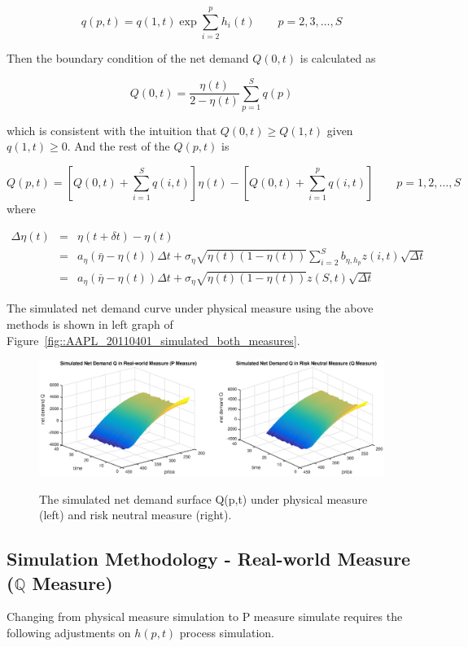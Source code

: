 \documentclass{article}
\begin{document}
$$
q(p,t) = q(1,t) \exp{\sum_{i=2}^{p}h_i(t)} \qquad p = 2, 3, \ldots, S
$$

Then the boundary condition of the net demand $Q(0,t)$ is calculated as

$$
Q(0,t) = \frac{\eta(t)}{2-\eta(t)} \sum_{p=1}^{S} q(p)
$$

which is consistent with the intuition that $Q(0,t) \geq Q(1,t)$ given $q(1,t)\geq 0$. And the rest of the $Q(p,t)$ is

$$
Q(p,t) = [Q(0,t) + \sum_{i=1}^{S}q(i,t)]\eta(t) - [Q(0,t) + \sum_{i=1}^{p}q(i,t)]  \qquad p = 1, 2, \ldots, S
$$
where

\begin{eqnarray*}
\Delta \eta(t) &=& \eta(t+\delta t) - \eta(t) \\
         &=& a_{\eta}(\bar{\eta} - \eta(t)) \Delta t + \sigma_{\eta} \sqrt{\eta(t)(1-\eta(t))}  \sum_{i=2}^{S} b_{\eta,h_p} z(i,t) \sqrt{\Delta t } \\
         &=& a_{\eta}(\bar{\eta} - \eta(t))\Delta t + \sigma_{\eta} \sqrt{\eta(t)(1-\eta(t))} z(S,t) \sqrt{\Delta t }
\end{eqnarray*}

The simulated net demand curve under physical measure using the above methods is shown in left graph of Figure~\ref{fig::AAPL_20110401_simulated_both_measures}.

\begin{center}
\begin{figure}
  \centering
  \includegraphics[scale = 0.5]{Q_both_measures.eps}\\
  \caption{The simulated net demand surface Q(p,t) under physical measure (left) and risk neutral measure (right).}\label{fig::AAPL_20110401_simulated_Q_P_measure}
\end{figure}
\end{center}

\subsection{Simulation Methodology - Real-world Measure ($\mathbb{Q}$ Measure)}
Changing from physical measure simulation to P measure simulate requires the following adjustments on $h(p,t)$ process simulation.
\end{document}
